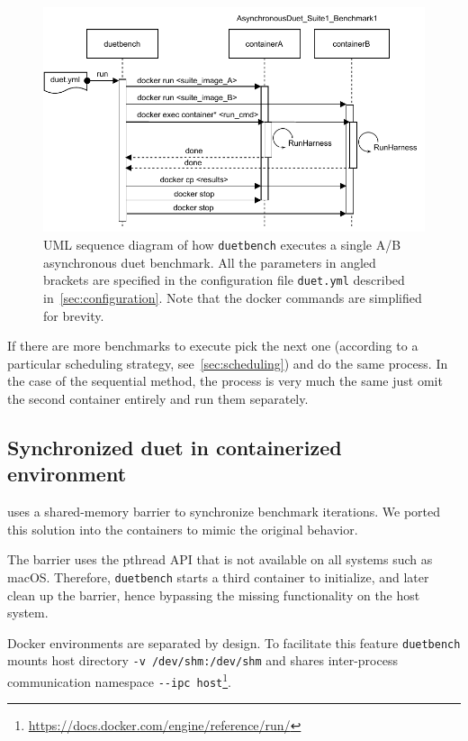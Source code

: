 \begin{figure}[!ht]
    \centering
    \includegraphics[width=\linewidth]{./figures/duetbench-sequence.drawio.pdf}
    \caption{
        UML sequence diagram of how \lstinline{duetbench} executes a single A/B asynchronous duet benchmark.
        All the parameters in angled brackets are specified in the configuration file \lstinline{duet.yml} described in~\cref{sec:configuration}.
        Note that the docker commands are simplified for brevity.
    }
    \label{fig:duetbench_sequence}
\end{figure}

If there are more benchmarks to execute pick the next one (according to a particular scheduling strategy, see~\cref{sec:scheduling}) and do the same process.
In the case of the sequential method, the process is very much the same just omit the second container entirely and run them separately.

\subsection{Synchronized duet in containerized environment}
\label{sec:sync_duet_impl}

\citet{bulej2020duet} uses a \mbox{shared-memory} barrier to synchronize benchmark iterations.
We ported this solution into the containers to mimic the original behavior.

The barrier uses the pthread API that is not available on all systems such as macOS.
Therefore, \lstinline{duetbench} starts a third container to initialize, and later clean up the barrier, hence bypassing the missing functionality on the host system.

Docker environments are separated by design.
To facilitate this feature \lstinline{duetbench} mounts host directory \lstinline{-v /dev/shm:/dev/shm} and shares \mbox{inter-process} communication namespace \lstinline{--ipc host}\footnote{\url{https://docs.docker.com/engine/reference/run/}}.

